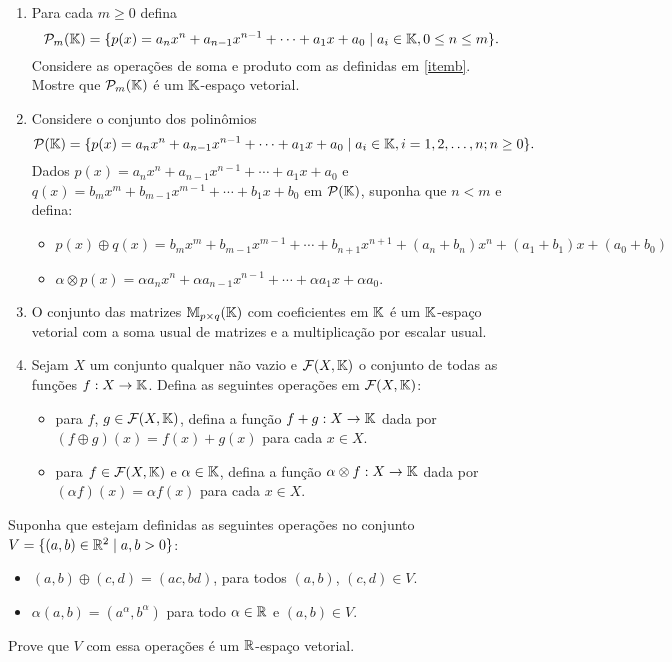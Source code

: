 \documentclass[12pt]{exam}
\begin{document}
\begin{exercicio}
\begin{enumerate}[label={\alph*})]
    \item Para cada $m \ge 0$ defina
    \[
      \mathcal{P}_m(\mathbb{K}) = \{ p(x) = a_nx^n + a_{n - 1}x^{n - 1} + \cdots + a_1x + a_0 \mid a_i \in \mathbb{K}, 0 \le n \le m \}.
    \]
    Considere as operações de soma e produto com as definidas em \ref{itemb}. Mostre que $\mathcal{P}_m(\mathbb{K})$ é um $\mathbb{K}$-espaço vetorial.

    \item Considere o conjunto dos polin\^omios
    \[
      \mathcal{P}(\mathbb{K}) = \{ p(x) = a_nx^n + a_{n - 1}x^{n - 1} + \cdots + a_1x + a_0 \mid a_i \in \mathbb{K}, i = 1, 2, \dots, n; n \ge 0 \}.
    \]
    Dados $p(x) = a_nx^n + a_{n - 1}x^{n - 1} + \cdots + a_1x + a_0$ e $q(x) = b_mx^m + b_{m - 1}x^{m - 1} + \cdots + b_1x + b_0$ em $\mathcal{P}(\mathbb{K})$, suponha que $n < m$ e defina:
    \begin{itemize}
      \item $p(x) \oplus q(x) = b_mx^m + b_{m - 1}x^{m - 1} + \cdots + b_{n + 1}x^{n + 1} + (a_n + b_n)x^n + (a_1 + b_1)x + (a_0 + b_0)$
      \item $\alpha\otimes p(x) = \alpha a_nx^n + \alpha a_{n - 1}x^{n - 1} + \cdots + \alpha a_1x + \alpha a_0$.
    \end{itemize}

    \item O conjunto das matrizes $\mathbb{M}_{p \times q}(\mathbb{K})$ com coeficientes em $\mathbb{K}$ é um $\mathbb{K}$-espaço vetorial com a soma usual de matrizes e a multiplicação por escalar usual.

    \item Sejam $X$ um conjunto qualquer não vazio e $\mathcal{F}(X, \mathbb{K})$ o conjunto de todas as funções $f : X \to \mathbb{K}$. Defina as seguintes operações em $\mathcal{F}(X, \mathbb{K})$:
    \begin{itemize}
      \item  para $f$, $g \in \mathcal{F}(X, \mathbb{K})$, defina a função $f + g : X \to \mathbb{K}$ dada por $(f\oplus g)(x) = f(x) + g(x)$ para cada $x \in X$.
      \item para $f \in \mathcal{F}(X, \mathbb{K})$ e $\alpha \in \mathbb{K}$, defina a função $\alpha \otimes f: X \to \mathbb{K}$ dada por $(\alpha f)(x) = \alpha f(x)$ para cada $x \in X$.
    \end{itemize}
  \end{enumerate}
\end{exercicio}

\begin{exercicio}
  Suponha que estejam definidas as seguintes operações no conjunto $V = \{(a, b) \in \mathbb{R}^2 \mid a, b > 0\}$:
  \begin{itemize}
    \item $(a, b) \oplus (c, d) = (ac, bd)$, para todos $(a,b)$, $(c,d) \in V$.
    \item $\alpha (a, b) = (a^\alpha, b^\alpha)$ para todo $\alpha \in \mathbb{R}$ e $(a, b) \in V$.
  \end{itemize}
  Prove que $V$ com essa operações é um $\mathbb{R}$-espaço vetorial.
\end{exercicio}
\end{document}
